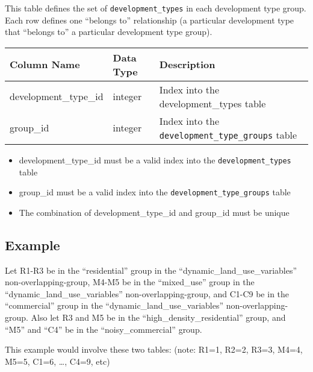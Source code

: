 This table defines the set of \verb|development_types| in each
development type group. Each row defines one ``belongs to'' relationship (a
particular development type that ``belongs to'' a particular
development type group).

\begin{tabular}{|l|l|l|}
\hline
\textbf{Column Name} & \textbf{Data Type} & \textbf{Description} \\

\hline
development_type_id & integer & Index into the development_types table  \\
\hline
group_id & integer & Index into the \verb|development_type_groups| table  \\
\hline

\end{tabular}

\begin{itemize}
\tight
\item development_type_id must be a valid index into the \verb|development_types| table
\item group_id must be a valid index into the \verb|development_type_groups| table
\item The combination of development_type_id and group_id must be unique

\end{itemize}

\subsection{Example}

Let R1-R3 be in the
``residential'' group in the ``dynamic_land_use_variables''
non-overlapping-group, M4-M5 be in the ``mixed_use'' group in the
``dynamic_land_use_variables'' non-overlapping-group, and C1-C9 be in the
``commercial'' group in the ``dynamic_land_use_variables'' \variablesindex
non-overlapping-group. Also let R3 and M5 be in the
``high_density_residential'' group, and ``M5'' and ``C4'' be in the
``noisy_commercial'' group.

This example would involve these two tables: (note: R1=1, R2=2, R3=3,
M4=4, M5=5, C1=6, \ldots, C4=9, etc)

